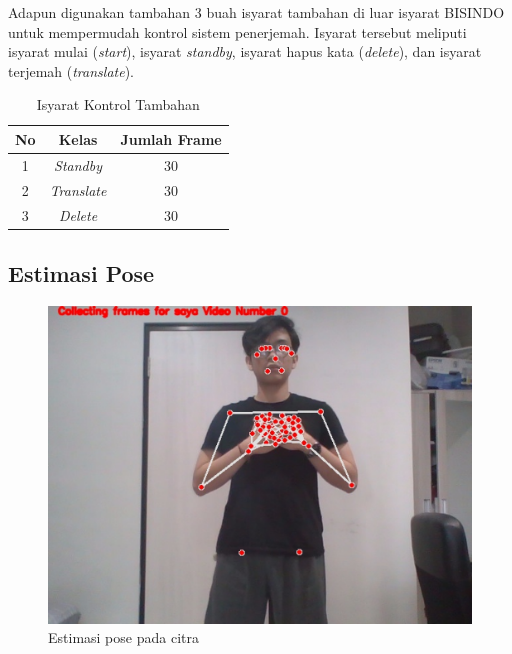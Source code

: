 Adapun digunakan tambahan 3 buah isyarat tambahan di luar isyarat BISINDO untuk mempermudah kontrol sistem penerjemah. Isyarat tersebut meliputi isyarat mulai (\textit{start}), isyarat \textit{standby}, isyarat hapus kata (\textit{delete}), dan isyarat terjemah (\textit{translate}).  
\begin{longtable}{|c|c|c|}
  \caption{Isyarat Kontrol Tambahan}
  \label{tb:isyaratkontrol}                                   \\
  \hline
  \rowcolor[HTML]{C0C0C0}
  \textbf{No} & \textbf{Kelas} & \textbf{Jumlah Frame} \\
  \hline
  1            & \textit{Standby}                       & 30            \\
  2            & \textit{Translate}                     & 30            \\
  3            & \textit{Delete}                 & 30            \\
  \hline
\end{longtable}

\subsection{Estimasi Pose}

\begin{figure}[H]
  \centering

  \includegraphics[scale=0.6]{gambar/bab3-estimasi-pose.png}

  \caption{Estimasi pose pada citra}
  \label{fig:poseEstimationMethod}
\end{figure}

